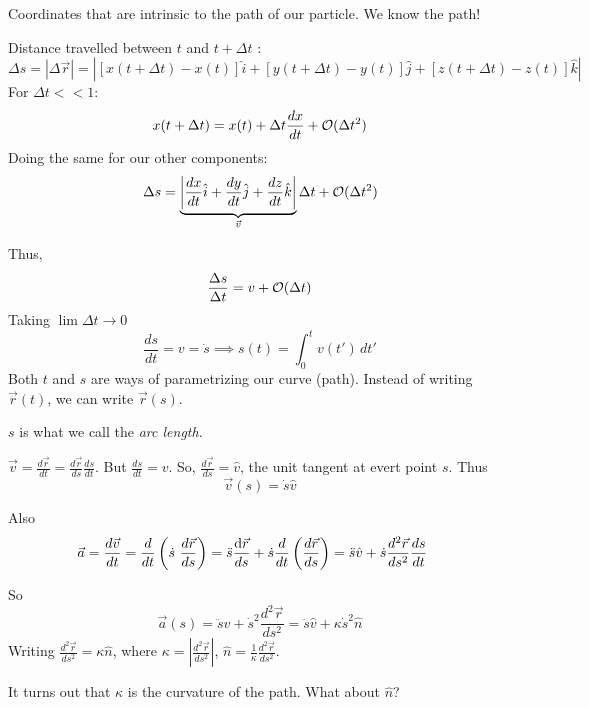 \pagebreak




Coordinates that are intrinsic to the path of our particle. We know the path!
\vspace*{120pt}

Distance travelled between $t$ and $t + \Delta t$
:
\[\Delta s = |\Delta \vec{r}| = \left|[x(t + \Delta t) - x(t)]\hat{i} + [y(t + \Delta t) - y(t)]\hat{j} + [z(t + \Delta t) - z(t)]\hat{k}\right|\]
For $\Delta t << 1$: 
\[x(t + \Delta t) = x(t) + \Delta t \frac{dx}{dt} + \cal{O}(\Delta t^2)\]
Doing the same for our other components:
\[\Delta s = \underbrace{\left|\frac{dx}{dt}\hat{i} + \frac{dy}{dt}\hat{j} + \frac{dz}{dt}\hat{k}\right|}_{\vec{v}}\Delta t + \cal{O}(\Delta t^2)\]

Thus,
\[\frac{\Delta s}{\Delta t} = v + \cal{O}(\Delta t)\]
Taking $\lim \Delta t \to 0$
\[\boxed{\frac{ds}{dt} = v = \dot{s} \implies s(t) = \int_0^t v(t')\,dt'}\]
Both $t$ and $s$ are ways of parametrizing our curve (path). Instead of writing $\vec{r}(t)$, we can write $\vec{r}(s)$. \\

\begin{definition} $s$ is what we call the \emph{arc length}. 

$\displaystyle{\vec{v} = \frac{d\vec{r}}{dt} = \frac{d\vec{r}}{ds}\frac{ds}{dt}}$. But $\displaystyle{\frac{ds}{dt} = v}$. So, $\displaystyle{\frac{d\vec{r}}{ds} = \hat{v}}$, the unit tangent at evert point $s$. Thus
\[\vec{v}(s) = \dot{s}\hat{v}\]

Also \[\begin{aligned}
	\vec{a} = \frac{d\vec{v}}{dt} = \frac{d}{dt}\left(\dot{s}~ \frac{d\vec{r}}{ds}\right) = \ddot{s}\frac{\d\vec{r}}{ds} + \dot{s}\frac{d}{dt}\left(\frac{d\vec{r}}{ds}\right) &= \ddot{s}\hat{v} + \dot{s}\frac{d^2\vec{r}}{ds^2}\frac{ds}{dt}
\end{aligned}
\]

So
\[\vec{a}(s) = \ddot{s}\hat{v} + \dot{s}^2\frac{d^2\vec{r}}{ds^2} = \ddot{s}\hat{v} + \kappa \dot{s}^2\hat{n}\]
Writing $\displaystyle{\frac{d^2\vec{r}}{ds^2} = \kappa \hat{n}}$, where $\displaystyle{\kappa =\left|\frac{d^2\vec{r}}{ds^2}\right| }$, $\hat{n} = \displaystyle{\frac{1}{\kappa}\frac{d^2\vec{r}}{ds^2}}$.
\end{definition}

It turns out that $\kappa$ is the curvature of the path. What about $\hat{n}$?

